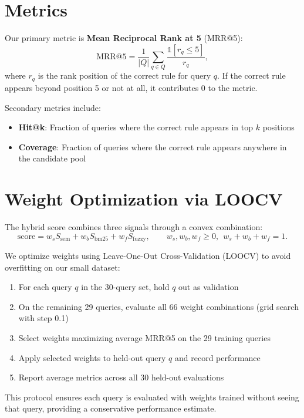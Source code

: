 \section{Metrics}
\label{sec:evaluation-metrics}

Our primary metric is \textbf{Mean Reciprocal Rank at 5} (MRR@5):
\[
\mathrm{MRR@5}=\frac{1}{|Q|}\sum_{q\in Q} \frac{\mathbb{1}[r_q\le 5]}{r_q},
\]
where $r_q$ is the rank position of the correct rule for query $q$. If the correct rule appears beyond position 5 or not at all, it contributes 0 to the metric.

Secondary metrics include:
\begin{itemize}[leftmargin=*,itemsep=2pt,topsep=2pt]
  \item \textbf{Hit@k}: Fraction of queries where the correct rule appears in top $k$ positions
  \item \textbf{Coverage}: Fraction of queries where the correct rule appears anywhere in the candidate pool
\end{itemize}

\section{Weight Optimization via LOOCV}
\label{sec:evaluation-loocv}

The hybrid score combines three signals through a convex combination:
\[
\text{score} = w_s S_{\text{sem}} + w_b S_{\text{bm25}} + w_f S_{\text{fuzzy}},
\qquad w_s,w_b,w_f\ge 0,\ \ w_s+w_b+w_f=1.
\]

We optimize weights using Leave-One-Out Cross-Validation (LOOCV) to avoid overfitting on our small dataset:

\begin{enumerate}
  \item For each query $q$ in the 30-query set, hold $q$ out as validation
  \item On the remaining 29 queries, evaluate all 66 weight combinations (grid search with step 0.1)
  \item Select weights maximizing average MRR@5 on the 29 training queries
  \item Apply selected weights to held-out query $q$ and record performance
  \item Report average metrics across all 30 held-out evaluations
\end{enumerate}

This protocol ensures each query is evaluated with weights trained without seeing that query, providing a conservative performance estimate.

